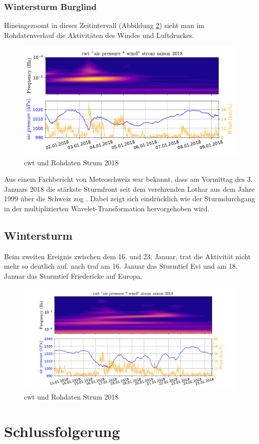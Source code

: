 \begin{refsection}
\subsubsection{Wintersturm Burglind}
Hineingezoomt in dieses Zeitintervall (Abbildung \ref{fig:cwt_storm_zoom}) sieht man im Rohdatenverlauf die Aktivitäten des Windes und Luftdruckes. 
\begin{figure}[h]
	\centering
	\includegraphics[width=1\textwidth]{papers/wwt/images/storm_airp_wind_zoom.pdf}
	\caption{cwt und Rohdaten Strum 2018}
	\label{fig:cwt_storm_zoom}
\end{figure}
Aus einem Fachbericht von Meteoschweiz war bekannt, dass am Vormittag des 3. Januars 2018 die stärkste Sturmfront seit dem verehrenden Lothar aus dem Jahre 1999 über die Schweiz zog \cite{Fachbericht:Burglind}.
Dabei zeigt sich eindrücklich wie der Sturmdurchgang in der multiplizierten Wavelet-Transformation hervorgehoben wird.

\subsection{Wintersturm }
Beim zweiten Ereignis zwischen dem 16. und 23. Januar, trat die Aktivität nicht mehr so deutlich auf.
nach \cite{online:sturmarchiv} traf am 16. Januar das Sturmtief Evi und am 18. Januar das Sturmtief Friedericke auf Europa.

\begin{figure}[h]
	\centering
	\includegraphics[width=1\textwidth]{papers/wwt/images/storm_airp_wind_zoom2.pdf}
	\caption{cwt und Rohdaten Strum 2018}
	\label{fig:cwt_storm_zoom}
\end{figure}


\section{Schlussfolgerung}

\printbibliography[heading=subbibliography]
\end{refsection}
